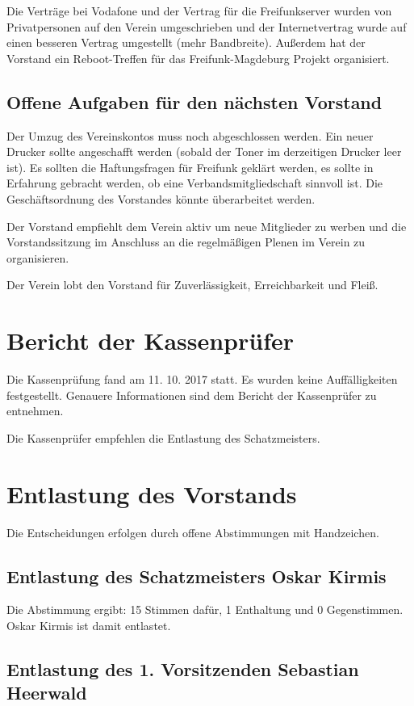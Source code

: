 \documentclass[a4paper,12pt,titlepage]{scrartcl}
\begin{document}
Die Verträge bei Vodafone und der Vertrag für die Freifunkserver wurden von Privatpersonen auf den Verein umgeschrieben und der Internetvertrag wurde auf einen besseren Vertrag umgestellt (mehr Bandbreite). Außerdem hat der Vorstand ein Reboot-Treffen für das Freifunk-Magdeburg Projekt organisiert.

\subsection{Offene Aufgaben für den nächsten Vorstand}

Der Umzug des Vereinskontos muss noch abgeschlossen werden. Ein neuer Drucker
sollte angeschafft werden (sobald der Toner im derzeitigen Drucker leer ist).
Es sollten die Haftungsfragen für Freifunk geklärt werden, es sollte in Erfahrung gebracht werden, ob eine Verbandsmitgliedschaft sinnvoll ist.
Die Geschäftsordnung des Vorstandes könnte überarbeitet werden.


Der Vorstand empfiehlt dem Verein aktiv um neue Mitglieder zu werben und die Vorstandssitzung im Anschluss an die regelmäßigen Plenen im Verein zu organisieren.

Der Verein lobt den Vorstand für Zuverlässigkeit, Erreichbarkeit und Fleiß.

\section{ Bericht der Kassenprüfer }
Die Kassenprüfung fand am 11. 10. 2017 statt. Es wurden keine Auffälligkeiten festgestellt.
Genauere Informationen sind dem Bericht der Kassenprüfer zu entnehmen.

Die Kassenprüfer empfehlen die Entlastung des Schatzmeisters.

\section{Entlastung des Vorstands}

Die Entscheidungen erfolgen durch offene Abstimmungen mit Handzeichen.

\subsection{Entlastung des Schatzmeisters Oskar Kirmis}

Die Abstimmung ergibt: 15 Stimmen dafür, 1 Enthaltung und 0 Gegenstimmen. Oskar Kirmis ist damit entlastet.

\subsection{Entlastung des 1. Vorsitzenden Sebastian Heerwald}
\end{document}
